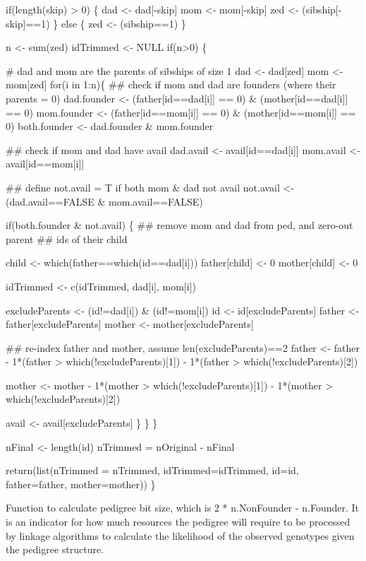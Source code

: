 \documentclass{article}
\begin{document}
\begin{nwchunk}
   if(length(skip) > 0) \{
   dad <- dad[-skip]
   mom <- mom[-skip]
   zed <- (sibship[-skip]==1) 
   \} else \{
   zed <- (sibship==1)
   \}
   
   n <- sum(zed)
   idTrimmed <- NULL
   if(n>0)
   \{
   
   # dad and mom are the parents of sibships of size 1
   dad <- dad[zed]
   mom <- mom[zed]
   for(i in 1:n)\{
   ## check if mom and dad are founders (where their parents = 0)
   dad.founder <- (father[id==dad[i]] == 0) & (mother[id==dad[i]] == 0)
   mom.founder <- (father[id==mom[i]] == 0) & (mother[id==mom[i]] == 0)
   both.founder <- dad.founder & mom.founder
   
   ## check if mom and dad have avail
   dad.avail <- avail[id==dad[i]]
   mom.avail <- avail[id==mom[i]]
   
   ## define not.avail = T if both mom & dad not avail
   not.avail <- (dad.avail==FALSE & mom.avail==FALSE)
   
   if(both.founder & not.avail)   \{
   ## remove mom and dad from ped, and zero-out parent 
   ## ids of their child
   
   child <- which(father==which(id==dad[i]))          
   father[child] <- 0
   mother[child] <- 0
   
   idTrimmed <- c(idTrimmed, dad[i], mom[i])
   
   excludeParents <- (id!=dad[i]) & (id!=mom[i])
   id <- id[excludeParents]
   father <- father[excludeParents]
   mother <- mother[excludeParents]
   
   ## re-index father and mother, assume len(excludeParents)==2
   father <- father - 1*(father > which(!excludeParents)[1]) -
   1*(father > which(!excludeParents)[2])
   
   mother <- mother - 1*(mother > which(!excludeParents)[1]) -
   1*(mother > which(!excludeParents)[2])
   
   avail <- avail[excludeParents]
   \} 
   \}
   \}
   
   nFinal <- length(id)
   nTrimmed = nOriginal - nFinal 
   
   return(list(nTrimmed = nTrimmed, idTrimmed=idTrimmed,
   id=id, father=father, mother=mother))
 \}
 
\end{nwchunk}

Function to calculate pedigree bit size, which is 
2 * n.NonFounder  - n.Founder.  It is an indicator for how much resources
the pedigree will require to be processed by linkage algorithms to calculate
the likelihood of the observed genotypes given the pedigree structure.
\end{document}
